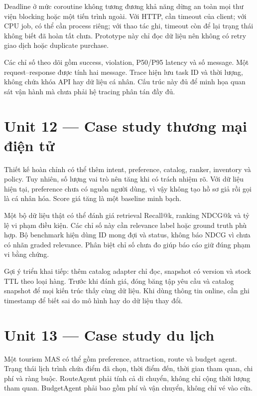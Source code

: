 Deadline ở mức coroutine không tương đương khả năng dừng an toàn mọi thư
viện blocking hoặc một tiến trình ngoài. Với HTTP, cần timeout của
client; với CPU job, có thể cần process riêng; với thao tác ghi, timeout
còn để lại trạng thái không biết đã hoàn tất chưa. Prototype này chỉ đọc
dữ liệu nên không có retry giao dịch hoặc duplicate purchase.

Các chỉ số theo dõi gồm success, violation, P50/P95 latency và số
message. Một request--response được tính hai message. Trace hiện lưu
task ID và thời lượng, không chứa khóa API hay dữ liệu cá nhân. Cấu trúc
này đủ để minh họa quan sát vận hành mà chưa phải hệ tracing phân tán
đầy đủ.

\section{Unit 12 --- Case study thương mại điện
tử}\label{unit-12-case-study-thux1b0ux1a1ng-mux1ea1i-ux111iux1ec7n-tux1eed}

Thiết kế hoàn chỉnh có thể thêm intent, preference, catalog, ranker,
inventory và policy. Tuy nhiên, số lượng vai trò nên tăng khi có trách
nhiệm rõ. Với dữ liệu hiện tại, preference chưa có nguồn người dùng, vì
vậy không tạo hồ sơ giả rồi gọi là cá nhân hóa. Score giá tăng là một
baseline minh bạch.

Một bộ dữ liệu thật có thể đánh giá retrieval Recall@k, ranking NDCG@k
và tỷ lệ vi phạm điều kiện. Các chỉ số này cần relevance label hoặc
ground truth phù hợp. Bộ benchmark hiện dùng ID mong đợi và status,
không báo NDCG vì chưa có nhãn graded relevance. Phân biệt chỉ số chưa
đo giúp báo cáo giữ đúng phạm vi bằng chứng.

Gợi ý triển khai tiếp: thêm catalog adapter chỉ đọc, snapshot có version
và stock TTL theo loại hàng. Trước khi đánh giá, đóng băng tập yêu cầu
và catalog snapshot để mọi kiến trúc thấy cùng dữ liệu. Khi dùng thông
tin online, cần ghi timestamp để biết sai do mô hình hay do dữ liệu thay
đổi.

\section{Unit 13 --- Case study du
lịch}\label{unit-13-case-study-du-lux1ecbch}

Một tourism MAS có thể gồm preference, attraction, route và budget
agent. Trạng thái lịch trình chứa điểm đã chọn, thời điểm đến, thời gian
tham quan, chi phí và ràng buộc. RouteAgent phải tính cả di chuyển,
không chỉ cộng thời lượng tham quan. BudgetAgent phải bao gồm phí và vận
chuyển, không chỉ vé vào cửa.

